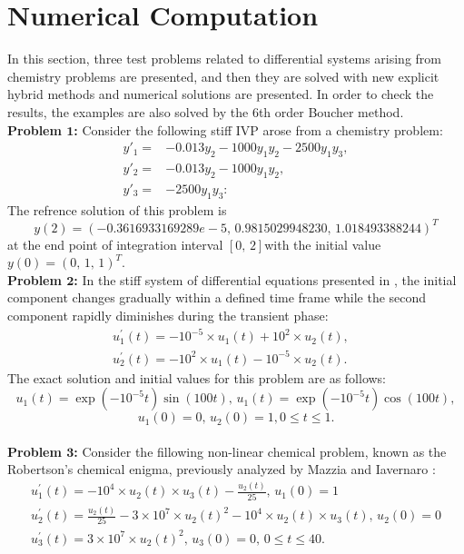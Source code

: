 \documentclass[11pt,twoside, final]{amsart}
\begin{document}
\section{\textbf{Numerical Computation}}
\noindent
In this section, three test problems related to differential systems arising from chemistry problems are presented, and then they are solved with new explicit hybrid methods and numerical solutions are presented. In order to check the results, the examples are also solved by the 6th order Boucher method.\\
\noindent
\textbf{Problem $\mathbf{1}$:}
Consider the following stiff  IVP arose from a chemistry problem\cite{ALI5,ALI2,ALI1}:
\begin{align*}\label{}
y'_{1}=& -0.013 y_{2}-1000y_{1}y_{2}-2500y_{1}y_{3},\\
y'_{2}=& -0.013y_{2}-1000y_{1}y_{2},\\
y'_{3}=& -2500y_{1}y_{3}:
\end{align*}
The  refrence solution of this  problem is  $$y(2)=(-0.3616933169289e-5,\, 0.9815029948230, \,1.018493388244)^{T}$$
at the end point of integration interval $[0,\,2]$with the initial value $y(0)=(0,\,1,\,1)^{T}$. 
\vspace{0.2 cm}\\
\noindent
\textbf{Problem $\mathbf{2}$:}
In the stiff system of differential equations presented in \cite{Q24}, the initial component changes gradually within a defined time frame while the second component rapidly diminishes during the transient phase:
\begin{eqnarray*}
u_{1}^{'}(t)= -10^{-5}\times u_{1}(t)+10^{2}\times u_{2}(t),&\\
u_{2}^{'}(t)= -10^{2}\times u_{1}(t)-10^{-5}\times u_{2}(t).
\end{eqnarray*}
The exact solution and initial values for this problem are as follows:
\[u_{1}(t)=\exp( -10^{-5}t)\sin(100t),\,u_{1}(t)=\exp( -10^{-5}t)\cos(100t),\]
\[u_{1}(0)=0,\, u_{2}(0)=1, 0\leq t \leq 1.\]
\vspace{0.2 cm}\\
\noindent
\textbf{Problem $\mathbf{3}$:}
 Consider the fillowing non-linear chemical problem, known as the Robertson’s chemical enigma, previously analyzed by Mazzia and Iavernaro \cite{Q24}:
\begin{eqnarray*}
u_{1}^{'}(t)= -10^{4}\times u_{2}(t)\times u_{3}(t)-\frac{u_{2}(t)}{25},\, u_{1}(0)=1\\
u_{2}^{'}(t)=\frac{u_{2}(t)}{25}-3\times 10^{7}\times u_{2}(t)^{2}-10^{4}\times u_{2}(t)\times u_{3}(t),\, u_{2}(0)=0 \\
u_{3}^{'}(t)=3\times 10^{7}\times u_{2}(t)^{2},\, u_{3}(0)=0,\,  0\leq t \leq 40.
\end{eqnarray*}
\end{document}
